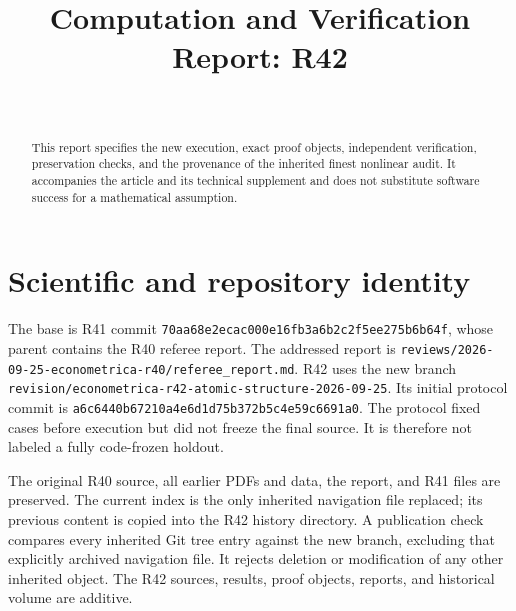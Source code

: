 

\begin{frontmatter}
\title{Computation and Verification Report: R42}
\begin{aug}\author[id=au1,addressref={add1}]{~}\address[id=add1]{}\end{aug}
\begin{abstract}This report specifies the new execution, exact proof objects, independent verification, preservation checks, and the provenance of the inherited finest nonlinear audit. It accompanies the article and its technical supplement and does not substitute software success for a mathematical assumption.\end{abstract}
\end{frontmatter}
\section{Scientific and repository identity}
The base is R41 commit \nolinkurl{70aa68e2ecac000e16fb3a6b2c2f5ee275b6b64f}, whose parent contains the R40 referee report. The addressed report is \nolinkurl{reviews/2026-09-25-econometrica-r40/referee_report.md}. R42 uses the new branch \nolinkurl{revision/econometrica-r42-atomic-structure-2026-09-25}. Its initial protocol commit is \nolinkurl{a6c6440b67210a4e6d1d75b372b5c4e59c6691a0}. The protocol fixed cases before execution but did not freeze the final source. It is therefore not labeled a fully code-frozen holdout.

The original R40 source, all earlier PDFs and data, the report, and R41 files are preserved. The current index is the only inherited navigation file replaced; its previous content is copied into the R42 history directory. A publication check compares every inherited Git tree entry against the new branch, excluding that explicitly archived navigation file. It rejects deletion or modification of any other inherited object. The R42 sources, results, proof objects, reports, and historical volume are additive.

